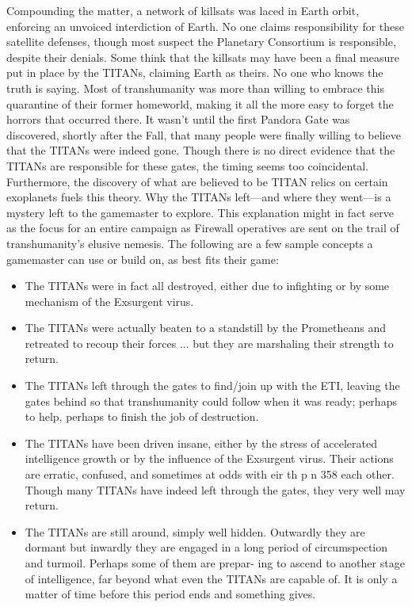 Compounding the matter, a network of killsats was 
laced in Earth orbit, enforcing an unvoiced interdiction 
of Earth. No one claims responsibility for these satellite 
defenses, though most suspect the Planetary Consortium
is responsible, despite their denials. Some think
that the killsats may have been a final measure put in 
place by the TITANs, claiming Earth as theirs. No one 
who knows the truth is saying. Most of transhumanity 
was more than willing to embrace this quarantine of 
their former homeworld, making it all the more easy to 
forget the horrors that occurred there. 
It wasn't until the first Pandora Gate was 
discovered, shortly after the Fall, that many people 
were finally willing to believe that the TITANs were 
indeed gone. Though there is no direct evidence that 
the TITANs are responsible for these gates, the timing 
seems too coincidental. Furthermore, the discovery 
of what are believed to be TITAN relics on certain 
exoplanets fuels this theory.
Why the TITANs left—and where they went—is 
a mystery left to the gamemaster to explore. This explanation
might in fact serve as the focus for an entire
campaign as Firewall operatives are sent on the trail 
of transhumanity's elusive nemesis. The following are 
a few sample concepts a gamemaster can use or build 
on, as best fits their game:

\begin{itemize}
\item The TITANs were in fact all destroyed, either due to infighting or by some mechanism of the Exsurgent virus. 
\item The TITANs were actually beaten to a standstill by the Prometheans and retreated to recoup their forces ... but they are marshaling their strength to return.
\item The TITANs left through the gates to find/join up with the ETI, leaving the gates behind so that transhumanity could follow when it was ready; perhaps to help, perhaps to finish the job of destruction.
\item The TITANs have been driven insane, either by the stress of accelerated intelligence growth or by the influence of the Exsurgent virus. Their actions are erratic, confused, and sometimes at odds with eir th p n 358 each other. Though many TITANs have indeed left through the gates, they very well may return.
\item The TITANs are still around, simply well hidden.  Outwardly they are dormant but inwardly they are engaged in a long period of circumspection and turmoil. Perhaps some of them are prepar- ing to ascend to another stage of intelligence, far beyond what even the TITANs are capable of. It is only a matter of time before this period ends and something gives.
\end{itemize}

